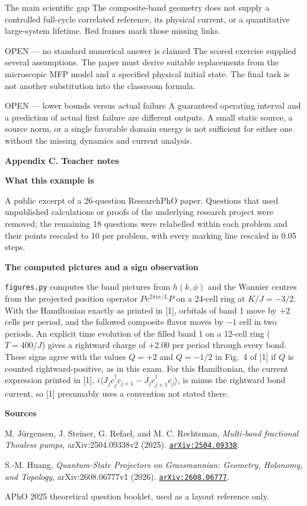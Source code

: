 \documentclass[11pt,a4paper]{article}
\newcommand{\pagetitle}[1]{{\large\bfseries\color{ink}#1}\par\vspace{4pt}}
\newcommand{\smallheading}[1]{\par\Needspace{6\baselineskip}\medskip\textbf{#1}\par}
\newcommand{\sourceentries}{%
\begin{enumerate}[label={[\arabic*]},leftmargin=9mm,itemsep=5pt,topsep=2pt]
\item M. J\"urgensen, J. Steiner, G. Refael, and M. C. Rechtsman, \emph{Multi-band fractional Thouless pumps}, arXiv:2504.09338v2 (2025). \href{https://arxiv.org/abs/2504.09338}{\texttt{arXiv:2504.09338}}.
\item S.-M. Huang, \emph{Quantum-State Projectors on Grassmannian: Geometry, Holonomy, and Topology}, arXiv:2608.06777v1 (2026). \href{https://arxiv.org/abs/2608.06777}{\texttt{arXiv:2608.06777}}.
\item APhO 2025 theoretical question booklet, used as a layout reference only.
\end{enumerate}}
\begin{document}
\begin{redbox}{The main scientific gap}
The composite-band geometry does not supply a controlled full-cycle correlated reference, its physical current, or a quantitative large-system lifetime. Red frames mark those missing links.
\end{redbox}
\begin{redbox}{OPEN --- no standard numerical answer is claimed}
The scored exercise supplied several assumptions. The paper must derive suitable replacements from the microscopic MFP model and a specified physical initial state. The final task is not another substitution into the classroom formula.
\end{redbox}
\begin{redbox}{OPEN --- lower bounds versus actual failure}
A guaranteed operating interval and a prediction of actual first failure are different outputs. A small static source, a source norm, or a single favorable domain energy is not sufficient for either one without the missing dynamics and current analysis.
\end{redbox}

\clearpage
\pagetitle{Appendix C. Teacher notes}
\smallheading{What this example is}
A public excerpt of a 26-question ResearchPhO paper. Questions that used unpublished calculations or proofs of the underlying research project were removed; the remaining 18 questions were relabelled within each problem and their points rescaled to 10 per problem, with every marking line rescaled in 0.05 steps.

\smallheading{The computed pictures and a sign observation}
\texttt{figures.py} computes the band pictures from $h(k,\phi)$ and the Wannier centres from the projected position operator $Pe^{2\pi ix/L}P$ on a 24-cell ring at $K/J=-3/2$. With the Hamiltonian exactly as printed in [1], orbitals of band 1 move by $+2$ cells per period, and the followed composite flavor moves by $-1$ cell in two periods. An explicit time evolution of the filled band 1 on a 12-cell ring ($T=400/J$) gives a rightward charge of $+2.00$ per period through every bond. These signs agree with the values $Q=+2$ and $Q=-1/2$ in Fig.~4 of [1] if $Q$ is counted rightward-positive, as in this exam. For this Hamiltonian, the current expression printed in [1], $i\langle J_jc_j^\dagger c_{j+1}-J_jc_{j+1}^\dagger c_j\rangle$, is minus the rightward bond current, so [1] presumably uses a convention not stated there.

\smallheading{Sources}
\sourceentries
\end{document}
